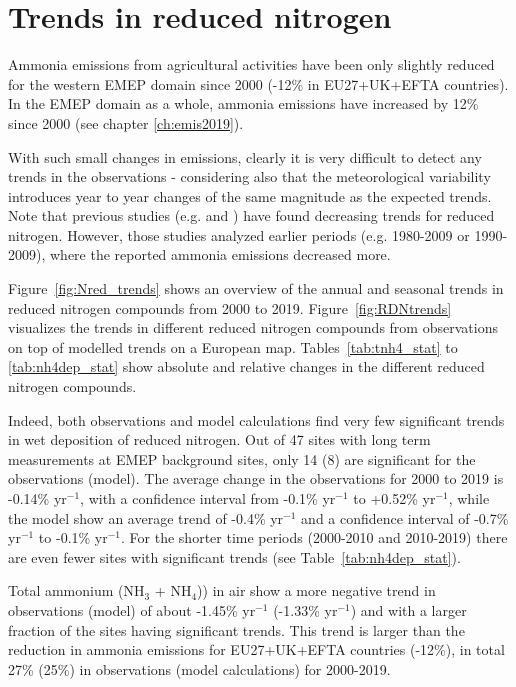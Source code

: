 \section{\label{sec:Trends_reduced nitrogen }Trends in reduced nitrogen}
Ammonia emissions from agricultural activities have been only slightly reduced for the western EMEP domain since 2000 (-12\% in EU27+UK+EFTA countries). In the EMEP domain as a whole, ammonia emissions have increased by 12\% since 2000 (see chapter \ref{ch:emis2019}).

With such small changes in emissions, clearly it is very difficult to detect any trends in the observations - considering also that the meteorological variability introduces year to year changes of the same magnitude as the expected trends.
Note that previous studies (e.g. \cite{torseth2012} and \cite{Theobald2019}) have found decreasing trends for reduced nitrogen. However, those studies analyzed earlier periods (e.g. 1980-2009 or 1990-2009), where the reported ammonia emissions decreased more.

Figure~\ref{fig:Nred_trends} shows an overview of the annual and seasonal trends in reduced nitrogen compounds from 2000 to 2019. Figure~\ref{fig:RDNtrends} visualizes the trends in different reduced nitrogen compounds from observations on top of modelled trends on a European map. Tables~\ref{tab:tnh4_stat} to \ref{tab:nh4dep_stat} show absolute and relative changes in the different reduced nitrogen compounds.

Indeed, both observations and model calculations find very few significant trends in wet deposition of reduced nitrogen. Out of 47 sites with long term measurements at EMEP background sites, only 14 (8) are significant for the observations (model). The average change in the observations for 2000 to 2019 is -0.14\% yr$^{-1}$, with a confidence interval from -0.1\% yr$^{-1}$ to +0.52\% yr$^{-1}$, while the model show an average trend of -0.4\% yr$^{-1}$ and a confidence interval of -0.7\% yr$^{-1}$ to -0.1\% yr$^{-1}$. For the shorter time periods (2000-2010 and 2010-2019) there are even fewer sites with significant trends (see Table~\ref{tab:nh4dep_stat}).

Total ammonium (NH$_3$ + NH$_4$)) in air show a more negative trend in observations (model) of about -1.45\% yr$^{-1}$ (-1.33\% yr$^{-1}$) and with a larger fraction of the sites having significant trends. This trend is larger than the reduction in ammonia emissions for EU27+UK+EFTA countries (-12\%), in total 27\% (25\%) in observations (model calculations) for 2000-2019.

